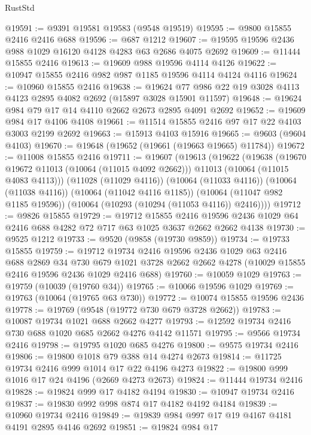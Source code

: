 \begin{lexlean}{RustStd}
\begin{coremodule}
@19591 := @9391 @19581 @19583 (@9548 @19519)
@19595 := @9800 @15855 @2416 @2416 @688
@19596 := @687 @1212
@19607 := @19595 @19596 @2436 @988 @1029 @16120 @4128 @4283 @63 @2686 @4075 @2692
@19609 := @11444 @15855 @2416
@19613 := @19609 @988 @19596 @4114 @4126
@19622 := @10947 @15855 @2416 @982 @987 @1185 @19596 @4114 @4124 @4116
@19624 := @10960 @15855 @2416
@19638 := @19624 @77 @986 @22 @19 @3028 @4113 @4123 @2895 @4082 @2692 (@15897 @3028 @15901 @11597)
@19648 := @19624 @984 @79 @17 @14 @4110 @2662 @2673 @2895 @4091 @2692
@19652 := @19609 @984 @17 @4106 @4108
@19661 := @11514 @15855 @2416 @97 @17 @22 @4103 @3003 @2199 @2692
@19663 := @15913 @4103 @15916
@19665 := @9603 (@9604 @4103)
@19670 := @19648 (@19652 (@19661 (@19663 @19665) @11784))
@19672 := @11008 @15855 @2416
@19711 := @19607
    (@19613
      (@19622
        (@19638
          (@19670 @19672 @11013 (@10064 (@11015 @4092 @2662)))
          @11013
          (@10064 (@11015 @4083 @4113)))
        (@11028 (@11029 @4116))
        (@10064 (@11033 @4116))
        (@10064 (@11038 @4116))
        (@10064 (@11042 @4116 @1185))
        (@10064 (@11047 @982 @1185 @19596))
        (@10064 (@10293 (@10294 (@11053 @4116)) @2416))))
@19712 := @9826 @15855
@19729 := @19712
    @15855
    @2416
    @19596
    @2436
    @1029
    @64
    @2416
    @688
    @4282
    @72
    @717
    @63
    @1025
    @3637
    @2662
    @2662
    @4138
@19730 := @9525 @1212
@19733 := @9520 (@9858 (@19730 @9859))
@19734 := @19733 @15855
@19759 := @19712
    @19734
    @2416
    @19596
    @2436
    @1029
    @63
    @2416
    @688
    @2869
    @34
    @730
    @679
    @1021
    @3728
    @2662
    @2662
    @4278
    (@10029 @15855 @2416 @19596 @2436 @1029 @2416 @688)
@19760 := @10059 @1029
@19763 := @19759 (@10039 (@19760 @34))
@19765 := @10066 @19596 @1029
@19769 := @19763 (@10064 (@19765 @63 @730))
@19772 := @10074 @15855 @19596 @2436
@19778 := @19769 (@9548 (@19772 @730 @679 @3728 @2662))
@19783 := @10087 @19734 @1021 @688 @2662 @4277
@19793 := @12592 @19734 @2416 @730 @688 @1020 @685 @2662 @4276 @4142 @11571
@19795 := @9566 @19734 @2416
@19798 := @19795 @1020 @685 @4276
@19800 := @9575 @19734 @2416
@19806 := @19800 @1018 @79 @388 @14 @4274 @2673
@19814 := @11725 @19734 @2416 @999 @1014 @17 @22 @4196 @4273
@19822 := @19800 @999 @1016 @17 @24 @4196 (@2669 @4273 @2673)
@19824 := @11444 @19734 @2416
@19828 := @19824 @999 @17 @4182 @4194
@19830 := @10947 @19734 @2416
@19837 := @19830 @992 @998 @874 @17 @4182 @4192 @4184
@19839 := @10960 @19734 @2416
@19849 := @19839 @984 @997 @17 @19 @4167 @4181 @4191 @2895 @4146 @2692
@19851 := @19824 @984 @17

\end{coremodule}
\end{lexlean}
